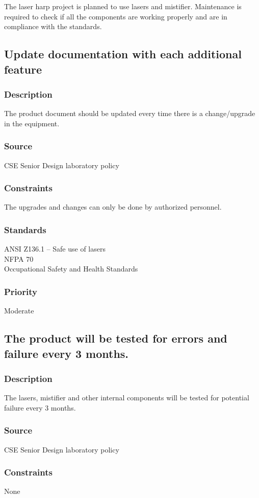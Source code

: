 The laser harp project is planned to use lasers and mistifier. Maintenance is required to check if all the components are working properly and are in compliance with the standards.  

\subsection{Update documentation with each additional feature}
\subsubsection{Description}
The product document should be updated every time there is a change/upgrade in the equipment.
\subsubsection{Source}
CSE Senior Design laboratory policy
\subsubsection{Constraints}
The upgrades and changes can only be done by authorized personnel.
\subsubsection{Standards}
ANSI Z136.1 – Safe use of lasers\\
NFPA 70\\
Occupational Safety and Health Standards
\subsubsection{Priority}
Moderate

\subsection{The product will be tested for errors and failure every 3 months.}
\subsubsection{Description}
The lasers, mistifier and other internal components will be tested for potential failure every 3 months.
\subsubsection{Source}
CSE Senior Design laboratory policy
\subsubsection{Constraints}
None
